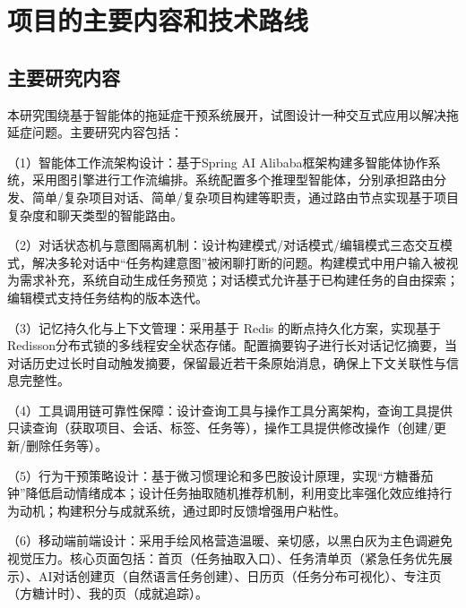 \clearpage

\setlength{\parindent}{2em}

\section{项目的主要内容和技术路线}

\subsection{主要研究内容}

\par 本研究围绕基于智能体的拖延症干预系统展开，试图设计一种交互式应用以解决拖延症问题。主要研究内容包括：

\par （1）智能体工作流架构设计：基于Spring AI Alibaba框架构建多智能体协作系统，采用图引擎进行工作流编排。系统配置多个推理型智能体，分别承担路由分发、简单/复杂项目对话、简单/复杂项目构建等职责，通过路由节点实现基于项目复杂度和聊天类型的智能路由。

\par （2）对话状态机与意图隔离机制：设计构建模式/对话模式/编辑模式三态交互模式，解决多轮对话中“任务构建意图”被闲聊打断的问题。构建模式中用户输入被视为需求补充，系统自动生成任务预览；对话模式允许基于已构建任务的自由探索；编辑模式支持任务结构的版本迭代。

\par （3）记忆持久化与上下文管理：采用基于 Redis 的断点持久化方案，实现基于Redisson分布式锁的多线程安全状态存储。配置摘要钩子进行长对话记忆摘要，当对话历史过长时自动触发摘要，保留最近若干条原始消息，确保上下文关联性与信息完整性。

\par （4）工具调用链可靠性保障：设计查询工具与操作工具分离架构，查询工具提供只读查询（获取项目、会话、标签、任务等），操作工具提供修改操作（创建/更新/删除任务等）。

\par （5）行为干预策略设计：基于微习惯理论和多巴胺设计原理，实现“方糖番茄钟”降低启动情绪成本；设计任务抽取随机推荐机制，利用变比率强化效应维持行为动机；构建积分与成就系统，通过即时反馈增强用户粘性。

\par （6）移动端前端设计：采用手绘风格营造温暖、亲切感，以黑白灰为主色调避免视觉压力。核心页面包括：首页（任务抽取入口）、任务清单页（紧急任务优先展示）、AI对话创建页（自然语言任务创建）、日历页（任务分布可视化）、专注页（方糖计时）、我的页（成就追踪）。

